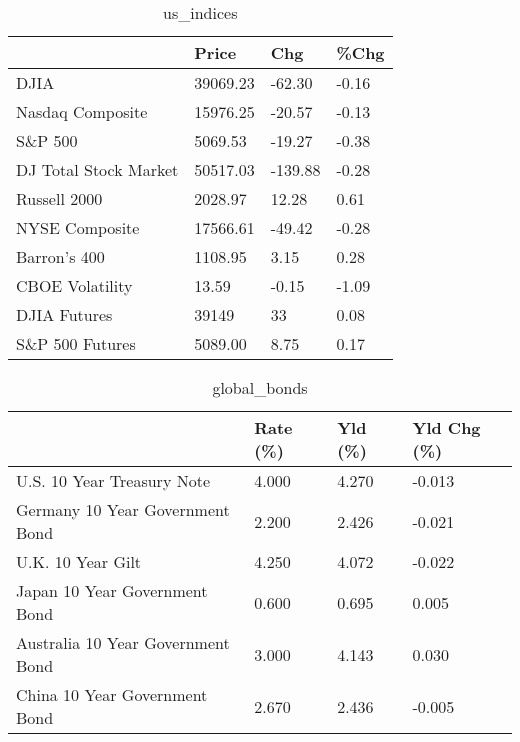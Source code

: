 \documentclass{article}%
\begin{document}
%


\begin{table}[htbp]%
\caption{us\_indices}%
\centering%
\begin{adjustbox}{width=1\textwidth}%
\begin{tabular}{llll}
\toprule
                      &    Price &     Chg &  \%Chg \\
\midrule
                 DJIA & 39069.23 &  -62.30 & -0.16 \\
     Nasdaq Composite & 15976.25 &  -20.57 & -0.13 \\
              S\&P 500 &  5069.53 &  -19.27 & -0.38 \\
DJ Total Stock Market & 50517.03 & -139.88 & -0.28 \\
         Russell 2000 &  2028.97 &   12.28 &  0.61 \\
       NYSE Composite & 17566.61 &  -49.42 & -0.28 \\
         Barron's 400 &  1108.95 &    3.15 &  0.28 \\
      CBOE Volatility &    13.59 &   -0.15 & -1.09 \\
         DJIA Futures &    39149 &      33 &  0.08 \\
      S\&P 500 Futures &  5089.00 &    8.75 &  0.17 \\
\bottomrule
\end{tabular}
%
\end{adjustbox}%
\end{table}

%


\begin{table}[htbp]%
\caption{global\_bonds}%
\centering%
\begin{adjustbox}{width=1\textwidth}%
\begin{tabular}{llll}
\toprule
                                  & Rate (\%) & Yld (\%) & Yld Chg (\%) \\
\midrule
       U.S. 10 Year Treasury Note &    4.000 &   4.270 &      -0.013 \\
  Germany 10 Year Government Bond &    2.200 &   2.426 &      -0.021 \\
                U.K. 10 Year Gilt &    4.250 &   4.072 &      -0.022 \\
    Japan 10 Year Government Bond &    0.600 &   0.695 &       0.005 \\
Australia 10 Year Government Bond &    3.000 &   4.143 &       0.030 \\
    China 10 Year Government Bond &    2.670 &   2.436 &      -0.005 \\
\bottomrule
\end{tabular}
%
\end{adjustbox}%
\end{table}
\end{document}
